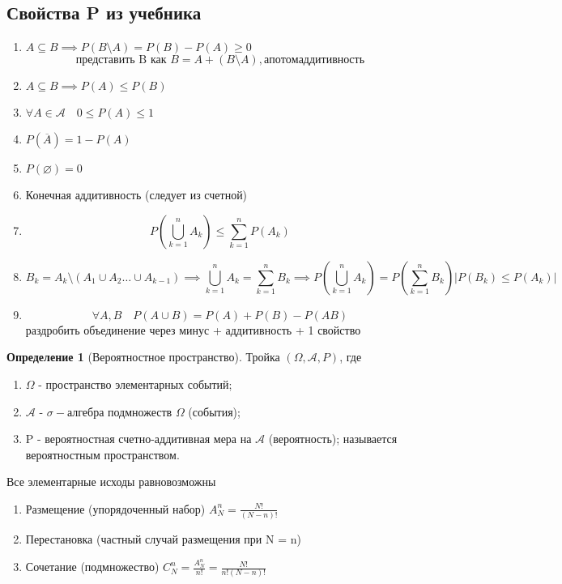 \documentclass[a4paper]{article}
\theoremstyle{definition}
\newtheorem*{definition}{Определение}
\theoremstyle{remark}
\begin{document}
\subsection{Свойства P из учебника}
\begin{enumerate}
    \item $A\subseteq B \implies P(B\setminus A) = P(B) - P(A) \ge 0$
    \[\text{представить B как } B = A + (B\setminus A), а потом аддитивность\]
    \item $A\subseteq B \implies P(A)\le P(B)$
    \item $\forall A \in \mathscr{A}\quad 0 \le P(A) \le 1$
    \item $P(\overline{A}) = 1 - P(A)$
    \item $P(\varnothing) = 0$
    \item Конечная аддитивность (следует из счетной)
    \item \[P(\bigcup\limits_{k = 1}^n A_k)  \le \sum_{k = 1}^n P(A_k) \]
    \item \[B_k = A_k \setminus (A_1 \cup A_2 \dots  \cup A_{k-1}) \implies \bigcup\limits_{k = 1}^n A_k = \sum_{k=1}^n  B_k \implies P (\bigcup\limits_{k = 1}^n A_k) = P(\sum_{k=1}^n  B_k) | P(B_k) \le P(A_k)|\]
    \item \[\forall A, B \quad P(A \cup B) = P(A) + P(B) - P(AB)\]
    раздробить объединение через минус + аддитивность + 1 свойство
\end{enumerate}
\begin{definition}[Вероятностное пространство]
    Тройка $(\Omega, \mathcal{A}, P)$, где 
    \begin{enumerate}
        \item $\Omega$ - пространство элементарных событий;
        \item $\mathcal{A}$ - $\sigma-$алгебра подмножеств $\Omega$ (события);
        \item P - вероятностная счетно-аддитивная мера на $\mathcal{A}$ (вероятность);
        называется вероятностным пространством.
    \end{enumerate}
\end{definition}
Все элементарные исходы равновозможны
\begin{enumerate}
    \item Размещение (упорядоченный набор) $ A^n_N = \frac{N!}{(N-n)!}$
    \item Перестановка (частный случай размещения при N = n)
    \item Сочетание (подмножество) $C^n_N = \frac{A^n_N}{n!} = \frac{N!}{n! (N-n)!}$
\end{enumerate}
\end{document}
